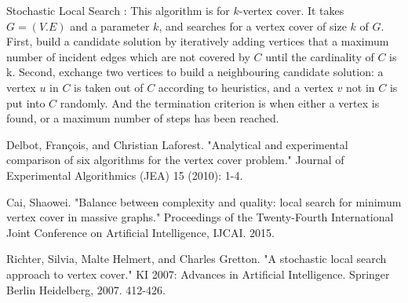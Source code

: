 \documentclass[12pt]{article}
\begin{document}
Stochastic Local Search\cite{richter2007stochastic} : This algorithm is for $k$-vertex cover. It takes $G = (V.E)$ and a parameter $k$, and searches for a vertex cover of size $k$ of $G$. First, build a candidate solution by iteratively adding vertices that a maximum number of incident edges which are not covered by $C$ until the cardinality of $C$ is k. Second, exchange two vertices to build a neighbouring candidate solution: a vertex $u$ in $C$ is taken out of $C$ according to heuristics, and a vertex $v$ not in $C$ is put into $C$ randomly. And the termination criterion is when either a vertex is found, or a maximum number of steps has been reached.
\vspace{-4ex}
\begin{thebibliography}{1}

Delbot, François, and Christian Laforest. "Analytical and experimental comparison of six algorithms for the vertex cover problem." Journal of Experimental Algorithmics (JEA) 15 (2010): 1-4.

Cai, Shaowei. "Balance between complexity and quality: local search for minimum vertex cover in massive graphs." Proceedings of the Twenty-Fourth International Joint Conference on Artificial Intelligence, IJCAI. 2015.

Richter, Silvia, Malte Helmert, and Charles Gretton. "A stochastic local search approach to vertex cover." KI 2007: Advances in Artificial Intelligence. Springer Berlin Heidelberg, 2007. 412-426.

\end{thebibliography}
 
\end{document}
